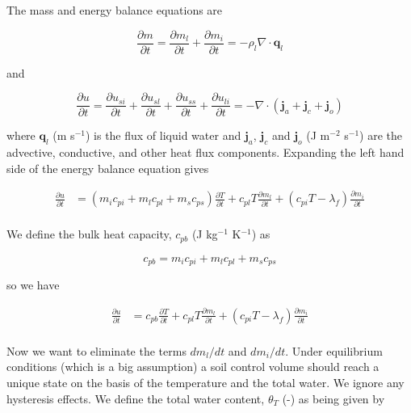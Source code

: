 \documentclass[10pt,a4paper]{article}
\begin{document}
The mass and energy balance equations are 

\begin{equation} \label{eq: FD_massbal}
\frac{\partial m}{\partial t}=\frac{\partial m_l}{\partial t}+\frac{\partial m_i}{\partial t}=-\rho_l \nabla\cdot \mathbf{q}_l
\end{equation}

and 

\begin{equation}
\frac{\partial u}{\partial t}=
\frac{\partial u_{si}}{\partial t}+
\frac{\partial u_{sl}}{\partial t}+
\frac{\partial u_{ss}}{\partial t}+
\frac{\partial u_{li}}{\partial t}=
-\nabla\cdot (\mathbf{j}_a+\mathbf{j}_c+\mathbf{j}_o)
\end{equation}

where $\mathbf{q}_l$ (m s$^{-1}$) is the flux of liquid water and $\mathbf{j}_a$, $\mathbf{j}_c$ and $\mathbf{j}_o$ (J m$^{-2}$ s$^{-1}$) are the advective, conductive, and other heat flux components. Expanding the left hand side of the energy balance equation gives

\begin{equation} \label{eq: UBal3DP}
	\begin{array}{ll}
		\displaystyle
\frac{\partial u}{\partial t}
&
		\displaystyle
=\left(m_{i} c_{pi} + m_{l} c_{pl} + m_{s} c_{ps}\right)
\frac{\partial T}{\partial t}
+c_{pl}T
\frac{\partial m_{l}}{\partial t}
+(c_{pi}T-\lambda_f)
\frac{\partial m_i}{\partial t}\\
	\end{array}
\end{equation}

We define the bulk heat capacity, $c_{pb}$ (J kg$^{-1}$ K$^{-1}$) as

\begin{equation}
c_{pb}=m_{i} c_{pi} + m_{l} c_{pl} + m_{s} c_{ps}
\end{equation}

so we have 

\begin{equation} \label{eq: UBal3DP}
	\begin{array}{ll}
		\displaystyle
\frac{\partial u}{\partial t}
&
		\displaystyle
=c_{pb}
\frac{\partial T}{\partial t}
+c_{pl}T
\frac{\partial m_{l}}{\partial t}
+(c_{pi}T-\lambda_f)
\frac{\partial m_i}{\partial t}\\
	\end{array}
\end{equation}


Now we want to eliminate the terms $dm_l/dt$ and $dm_i/dt$. Under equilibrium conditions (which is a big assumption) a soil control volume should reach a unique state on the basis of the temperature and the total water. We ignore any hysteresis effects. We define the total water content, $\theta_T$ (-) as being given by
\end{document}

